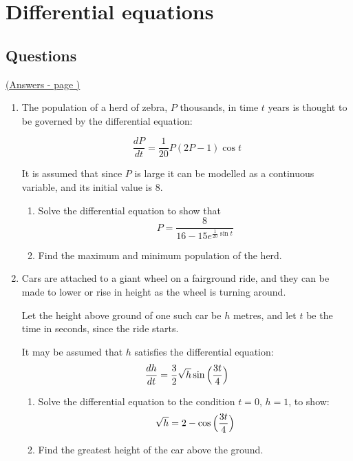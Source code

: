 \documentclass[../main.tex]{subfiles}
\begin{document}
\section{Differential equations}

\hypertarget{differentialequationslink}{\subsection*{Questions}}
\hyperlink{differentialequationsanswers}{(Answers - page {\pageref*{Differential equations answers}})}

\label{Differential equations}
\begin{enumerate}[itemsep=0.7cm]
    \item 
    The population of a herd of zebra, $P$ thousands, in time $t$ years is thought to be governed by the differential equation:

    \[\frac{dP}{dt}=\frac{1}{20}P(2P-1)\cos{t}\]

    It is assumed that since $P$ is large it can be modelled as a continuous variable, and its
    initial value is 8.

    \begin{enumerate}[itemsep=0.5cm]
        \item   
        Solve the differential equation to show that 
        \[P=\frac{8}{16-15e^{\frac{1}{20}\sin{t}}}\]

       \item 
       Find the maximum and minimum population of the herd.

    \end{enumerate}

    \item
    Cars are attached to a giant wheel on a fairground ride, and they can be made to lower or rise in height as the wheel is turning around.

    Let the height above ground of one such car be $h$ metres, and let $t$ be the time in seconds, since the ride starts.

    It may be assumed that $h$ satisfies the differential equation:
    \[\frac{dh}{dt}=\frac{3}{2}\sqrt{h}\sin{\Bigl(\frac{3t}{4}\Bigr)}\]

    \begin{enumerate}[itemsep=0.5cm]
        \item
        Solve the differential equation to the condition $t=0$, $h=1$, to show:
        \[\sqrt{h}=2-\cos{\Bigl(\frac{3t}{4}\Bigr)}\]

        \item
        Find the greatest height of the car above the ground.


\end{enumerate}
\end{enumerate}
\end{document}
